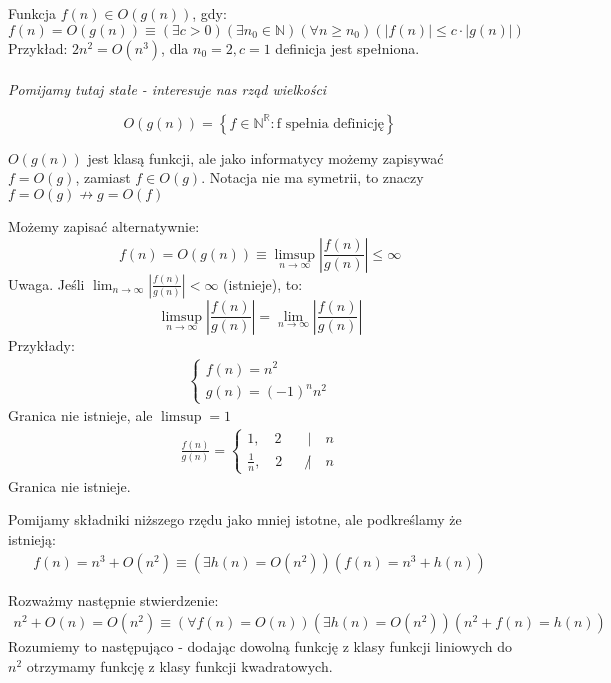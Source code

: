 \documentclass{article}
\numberwithin{equation}{subsection}
\newenvironment{definition}[1]{%
    \trivlist
    \item[\hskip\labelsep\textbf{Definition. #1.}]
    \ignorespaces
}{%
    \endtrivlist
}
\newenvironment{fact}[1]{%
    \trivlist
    \item[\hskip\labelsep\textbf{Fact. #1.}]
    \ignorespaces
}{%
    \endtrivlist
}
\begin{document}
\begin{definition}{Notacja Big-$O$}
    Funkcja $f(n)\in O(g(n))$, gdy:
    \[
        f(n) = O(g(n)) \equiv 
        \left(\exists c>0\right)
        \left(\exists n_0\in\mathbb{N}\right)
        \left(\forall n\geq n_0\right)
        \left(|f(n)| \leq c \cdot |g(n)|\right)
    \]
    \noindent
    Przykład: $2n^2 = O(n^3)$, dla $n_0 = 2, c = 1$ definicja jest spełniona.\\
    \\
    \textit{Pomijamy tutaj stałe - interesuje nas rząd wielkości}

    \[
        O(g(n)) = \left\{f\in\mathbb{N}^\mathbb{R} : \text{f spełnia definicję}\right\}
    \]

    \noindent
    $O(g(n))$ jest klasą funkcji, ale jako informatycy możemy zapisywać $f=O(g)$, zamiast $f\in O(g)$.
    Notacja nie ma symetrii, to znaczy $f=O(g) \nrightarrow  g=O(f)$ 
\end{definition}

\begin{fact}{Definicja Big-O za pomocą granicy}
    Możemy zapisać alternatywnie:
    \[
        f(n) = O(g(n)) \equiv \limsup_{n\rightarrow \infty} \left|\frac{f(n)}{g(n)}\right| \leq \infty
    \]
    \noindent
    Uwaga. Jeśli $\lim_{n\rightarrow \infty} \left|\frac{f(n)}{g(n)}\right| < \infty$ (istnieje), to:
    \[
        \limsup_{n\rightarrow \infty} \left|\frac{f(n)}{g(n)}\right| =  \lim_{n\rightarrow \infty} \left|\frac{f(n)}{g(n)}\right| 
    \]
\end{fact}
Przykłady:
\begin{align}
    \begin{cases}
        f(n) = n^2\\
        g(n) = (-1)^n n^2
    \end{cases}
\end{align}
Granica nie istnieje, ale $\limsup = 1$
\begin{align}
    \frac{f(n)}{g(n)} = \begin{cases}
        1, \quad 2 \quad &| \quad n\\
        \frac{1}{n}, \quad 2 \quad &{\not|} \quad n
    \end{cases}
\end{align}
Granica nie istnieje.

\begin{fact}{Dokładność zapisu Big-O}
    Pomijamy składniki niższego rzędu jako mniej istotne, ale podkreślamy że istnieją:
    \begin{align}
        f(n) = n^3 + O(n^2) \equiv 
        \left(\exists h(n) = O(n^2)\right)\left(f(n) = n^3 + h(n)\right)
    \end{align}

    \noindent
    Rozważmy następnie stwierdzenie:
    \begin{align}
        n^2 + O(n) = O(n^2) \equiv 
        \left(\forall f(n) = O(n)\right)
        \left(\exists h(n) = O(n^2)\right)
        \left(n^2 + f(n) = h(n)\right)
    \end{align}
    Rozumiemy to następująco - dodając dowolną funkcję z klasy funkcji liniowych do $n^2$ otrzymamy funkcję z klasy funkcji kwadratowych.
\end{fact}
\end{document}
